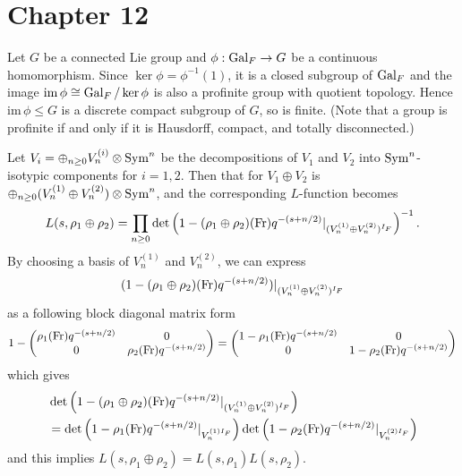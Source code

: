 \newpage
\section{Chapter 12}

\begin{problem}
Let $G$ be a connected Lie group and $\phi : \operatorname{\mathrm{Gal}}_F \to G$ be a continuous homomorphism.
Since $\ker \phi = \phi^{-1}(1)$, it is a closed subgroup of $\operatorname{\mathrm{Gal}}_F$ and the image $\mathrm{im\,}\phi \cong \operatorname{\mathrm{Gal}}_F / \ker \phi$
is also a profinite group with quotient topology.
Hence $\mathrm{im\,}\phi \leq G$ is a discrete compact subgroup of $G$, so is finite.
(Note that a group is profinite if and only if it is Hausdorff, compact, and totally disconnected.)
\end{problem}

\begin{problem} \notfinish
\end{problem}

\begin{problem} \notfinish
\end{problem}

\begin{problem} \notfinish
\end{problem}

\begin{problem} \notfinish
\end{problem}

\begin{problem} \notfinish
\end{problem}

\begin{problem}
Let $V_i = \oplus_{n \geq 0} V_{n}^{(i)} \otimes \operatorname{\mathrm{Sym}}^{n}$ be the decompositions of $V_1$ and $V_2$
into $\operatorname{\mathrm{Sym}}^n$-isotypic components for $i = 1, 2$.
Then that for $V_1 \oplus V_2$ is $\oplus_{n \geq 0} (V_n^{(1)} \oplus V_n^{(2)}) \otimes \operatorname{\mathrm{Sym}}^n$, and the
corresponding $L$-function becomes
$$
L(s, \rho_1 \oplus \rho_2) = \prod_{n \geq 0} \det\left(1 - (\rho_1 \oplus \rho_2)(\operatorname{\mathrm{Fr}})q^{-(s + n/2)}|_{(V_{n}^{(1)} \oplus V_{n}^{(2)})^{I_F}}\right)^{-1}.
$$
By choosing a basis of $V_n^{(1)}$ and $V_n^{(2)}$, we can express 
$$
(1 - (\rho_1 \oplus \rho_2)(\operatorname{\mathrm{Fr}})q^{-(s+n/2)})|_{(V_n^{(1)} \oplus V_{n}^{(2)})^{I_F}}
$$
as a following block diagonal matrix form
$$
1 - \begin{pmatrix}
    \rho_1(\operatorname{\mathrm{Fr}}) q^{-(s+n/2)} & 0 \\ 0 & \rho_2(\operatorname{\mathrm{Fr}}) q^{-(s+n/2)}
\end{pmatrix}
= \begin{pmatrix}
    1 - \rho_1(\operatorname{\mathrm{Fr}}) q^{-(s+n/2)} & 0 \\ 0 & 1 - \rho_2(\operatorname{\mathrm{Fr}}) q^{-(s+n/2)}
\end{pmatrix}
$$
which gives
\begin{align*}
&\det \left(1 - (\rho_1 \oplus \rho_2)(\operatorname{\mathrm{Fr}})q^{-(s+n/2)}|_{(V_n^{(1)} \oplus V_{n}^{(2)})^{I_F}}\right) \\
&= \det\left(1 - \rho_1(\operatorname{\mathrm{Fr}})q^{-(s + n/2)}|_{V_{n}^{(1)I_F}}\right) \det\left(1 - \rho_2(\operatorname{\mathrm{Fr}})q^{-(s + n/2)}|_{V_{n}^{(2)I_F}}\right)
\end{align*}
and this implies $L(s, \rho_1 \oplus \rho_2) = L(s, \rho_1) L(s, \rho_2)$.
\end{problem}

